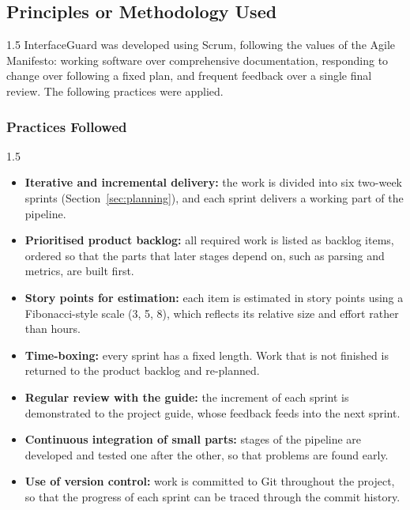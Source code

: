 \documentclass[12pt,a4paper]{article}
\begin{document}
\subsection{Principles or Methodology Used}

\begin{spacing}{1.5}
\justifying
InterfaceGuard was developed using Scrum, following the values of the Agile
Manifesto: working software over comprehensive documentation, responding to
change over following a fixed plan, and frequent feedback over a single
final review. The following practices were applied.
\end{spacing}

\subsubsection{Practices Followed}

\begin{spacing}{1.5}
\justifying
\begin{itemize}[leftmargin=*,itemsep=2pt]
  \item \textbf{Iterative and incremental delivery:} the work is divided into
        six two-week sprints (Section~\ref{sec:planning}), and each sprint
        delivers a working part of the pipeline.

  \item \textbf{Prioritised product backlog:} all required work is listed as
        backlog items, ordered so that the parts that later stages depend on,
        such as parsing and metrics, are built first.

  \item \textbf{Story points for estimation:} each item is estimated in story
        points using a Fibonacci-style scale (3, 5, 8), which reflects its
        relative size and effort rather than hours.

  \item \textbf{Time-boxing:} every sprint has a fixed length. Work that is
        not finished is returned to the product backlog and re-planned.

  \item \textbf{Regular review with the guide:} the increment of each sprint
        is demonstrated to the project guide, whose feedback feeds into the
        next sprint.

  \item \textbf{Continuous integration of small parts:} stages of the
        pipeline are developed and tested one after the other, so that
        problems are found early.

  \item \textbf{Use of version control:} work is committed to Git throughout
        the project, so that the progress of each sprint can be traced
        through the commit history.
\end{itemize}
\end{spacing}
\end{document}
